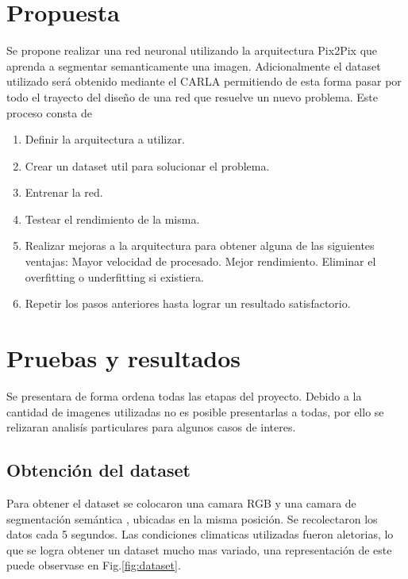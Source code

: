 \documentclass[]{IEEEtran}
\begin{document}
    \section{Propuesta}

    Se propone realizar una red neuronal utilizando la arquitectura Pix2Pix que 
    aprenda a segmentar semanticamente una imagen. Adicionalmente el 
    dataset utilizado será obtenido mediante el CARLA permitiendo de esta forma 
    pasar por todo el trayecto del diseño de una red que resuelve un nuevo problema. 
    Este proceso consta de 

    \begin{enumerate}
        \item Definir la arquitectura a utilizar.
        \item Crear un dataset util para solucionar el problema.
        \item Entrenar la red.
        \item Testear el rendimiento de la misma.
        \item Realizar mejoras a la arquitectura para obtener alguna de las siguientes ventajas: 
            \subitem Mayor velocidad de procesado.
            \subitem Mejor rendimiento. 
            \subitem Eliminar el overfitting o underfitting si existiera.
        \item Repetir los pasos anteriores hasta lograr un resultado satisfactorio.
    \end{enumerate}

    \section{Pruebas y resultados}

    Se presentara de forma ordena todas las etapas del proyecto. 
    Debido a la cantidad de imagenes utilizadas no es posible presentarlas a todas, por ello 
    se relizaran analisís particulares para algunos casos de interes.

    \subsection{Obtención del dataset}

    Para obtener el dataset se colocaron una camara RGB y una camara de segmentación semántica
    \cite{CARLA-Sensors-Reference}, ubicadas en la misma posición. Se recolectaron los datos 
    cada 5 segundos. Las condiciones climaticas utilizadas fueron aletorias, lo que se logra
    obtener un dataset mucho mas variado, una representación de este puede observase en 
    Fig.\ref{fig:dataset}.
\end{document}
